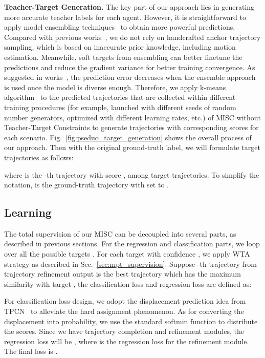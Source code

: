 \documentclass[10pt,twocolumn,letterpaper]{article}
\begin{document}
\noindent\textbf{Teacher-Target Generation.} 
The key part of our approach lies in generating more accurate teacher labels for each agent. 
However, it is straightforward to apply model ensembling techniques~\cite{he2020structure,laine2016temporal,tarvainen2017mean} to obtain more powerful predictions. Compared with previous works~\cite{breuer2021quo,chai2019multipath,zhao2020tnt}, we do not rely on handcrafted anchor trajectory sampling, which is based on inaccurate prior knowledge, including motion estimation. Meanwhile, soft targets from ensembling can better finetune the predictions and reduce the gradient variance for better training convergence. As suggested in works~\cite{dietterich2000ensemble,opitz1999popular}, the prediction error decreases when the ensemble approach is used once the model is diverse enough. Therefore, we apply k-means algorithm~\cite{macqueen1967some} to the predicted trajectories that are collected within different training procedures (for example, launched with different seeds of random number generators, optimized with different learning rates, etc.) of MISC without Teacher-Target Constraints to generate  trajectories with corresponding scores for each scenario.
Fig.~\ref{fig:pseduo_target_generation} shows the overall process of our approach. Then with the original ground-truth label, we will formulate  target trajectories as follows:
\vspace{-3mm}
 
where  is the -th trajectory with score , among  target trajectories. To simplify the notation,  is the ground-truth trajectory with  set to .




\subsection{Learning}
The total supervision of our MISC can be decoupled into several parts, as described in previous sections. For the regression and classification parts, we loop over all the possible  targets . For each target  with confidence , we apply WTA strategy as described in Sec.~\ref{sec:mpt_supervision}. Suppose -th trajectory from trajectory refinement output  is the best trajectory which has the maximum similarity with target , the classification loss and regression loss are defined as:

For classification loss design, we adopt the displacement prediction idea from TPCN~\cite{ye2021tpcn} to alleviate the hard assignment phenomenon. As for converting the displacement into probability, we use the standard softmin function to distribute the scores. Since we have trajectory completion and refinement modules, the regression loss will be , where  is the regression loss for the refinement module. The final loss is .
\end{document}
